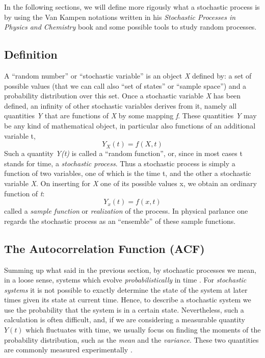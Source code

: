 \documentclass[12pt,a4paper]{report}
\begin{document}
In the following sections, we will define more rigously what a stochastic process is by using the Van Kampen notations written in his \emph{Stochastic Processes in Physics and Chemistry} book \cite{VanKampenBook} and some possible tools to study random processes.


\subsection{Definition}
A ``random number'' or ``stochastic variable'' is an object \emph{X} defined by: a set of possible values (that we can call also ``set of states'' or ``sample space'') and a probability distribution over this set. Once a stochastic variable \emph{X} has been defined, an infinity of other stochastic variables derives from it, namely all quantities \emph{Y} that are functions of \emph{X} by some mapping \emph{f}. These quantities \emph{Y} may be any kind of mathematical object, in particular also functions of an additional variable t,
\begin{equation}
    Y_{X}(t) = f(X,t)
\end{equation}
Such a quantity \emph{Y(t)} is called a ``random function'', or, since in most cases t stands for time, a \emph{stochastic process}. Thus a stochastic process is simply a function of two variables, one of which is the time t, and the other a stochastic variable \emph{X}. On inserting for \emph{X} one of its possible values x, we obtain an ordinary function of \emph{t}: 
\begin{equation}
    Y_{x}(t) = f(x,t) 
\end{equation}
called a \emph{sample function} or \emph{realization} of the process. In physical parlance one regards the stochastic process as an ``ensemble'' of these sample functions.

\subsection{The Autocorrelation Function (ACF)}\label{ACFSubsection}
Summing up what said in the previous section, by stochastic processes we mean, in a loose sense, systems which evolve \emph{probabilistically} in time \cite{Hand}. For \emph{stochastic systems} it is not possible to exactly determine the state of the system at later times given its state at current time. Hence, to describe a stochastic system we use the probability that the system is in a certain state. Nevertheless, such a calculation is often difficult, and, if we are considering a measurable quantity $Y(t)$ which fluctuates with time, we usually focus on finding the moments of the probability distribution, such as the \emph{mean} and the \emph{variance}. These two quantities are commonly measured experimentally \cite{Brizi}.
\end{document}
